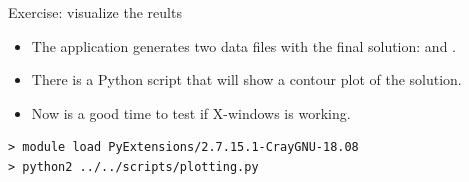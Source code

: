 \documentclass[aspectratio=43]{beamer}
\begin{document}
\begin{frame}[fragile]{Exercise: visualize the reults}
    \begin{itemize}
        \item The application generates two data files with the final solution:  and .
        \item There is a Python script that will show a contour plot  of the solution.
        \item Now is a good time to test if X-windows is working.
    \end{itemize}
\begin{lstlisting}[style=terminal]
> module load PyExtensions/2.7.15.1-CrayGNU-18.08
> python2 ../../scripts/plotting.py
\end{lstlisting}
\end{frame}

\end{document}
